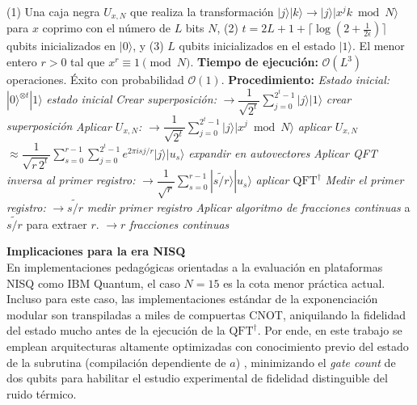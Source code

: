 \documentclass[12pt, spanish]{book}
\begin{document}
\begin{algorithm}[H]
    \caption{Búsqueda cuántica de orden \cite{Nielsen2024}}
    \label{alg:order_finding}
    \begin{algorithmic}[1]
        \Require (1) Una caja negra $U_{x,N}$ que realiza la transformación $|j\rangle|k\rangle \to |j\rangle|x^j k \bmod N\rangle$ para $x$ coprimo con el número de $L$ bits $N$, (2) $t = 2L + 1 + \lceil \log(2 + \frac{1}{2\epsilon}) \rceil$ qubits inicializados en $|0\rangle$, y (3) $L$ qubits inicializados en el estado $|1\rangle$.
        \Ensure El menor entero $r > 0$ tal que $x^r \equiv 1 \pmod{N}$.
        \Statex \textbf{Tiempo de ejecución:} $\mathcal{O}(L^3)$ operaciones. Éxito con probabilidad $\mathcal{O}(1)$.
        \Statex
        \Statex \textbf{Procedimiento:}
        \State \textit{Estado inicial:} $|0\rangle^{\otimes t}|1\rangle$ \hfill \textit{estado inicial}
        \State \textit{Crear superposición:}
        \Statex \hspace{2em} $\to \dfrac{1}{\sqrt{2^t}} \displaystyle\sum_{j=0}^{2^t-1} |j\rangle|1\rangle$ \hfill \textit{crear superposición}
        \State \textit{Aplicar $U_{x,N}$:}
        \Statex \hspace{2em} $\to \dfrac{1}{\sqrt{2^t}} \displaystyle\sum_{j=0}^{2^t-1} |j\rangle|x^j \bmod N\rangle$ \hfill \textit{aplicar $U_{x,N}$}
        \Statex \hspace{2em} $\approx \dfrac{1}{\sqrt{r\,2^t}} \displaystyle\sum_{s=0}^{r-1}\sum_{j=0}^{2^t-1} e^{2\pi i s j/r} |j\rangle|u_s\rangle$ \hfill \textit{expandir en autovectores}
        \State \textit{Aplicar QFT inversa al primer registro:}
        \Statex \hspace{2em} $\to \dfrac{1}{\sqrt{r}} \displaystyle\sum_{s=0}^{r-1} |\widetilde{s/r}\rangle|u_s\rangle$ \hfill \textit{aplicar $\mathrm{QFT}^{\dagger}$}
        \State \textit{Medir el primer registro:}
        \Statex \hspace{2em} $\to \widetilde{s/r}$ \hfill \textit{medir primer registro}
        \State \textit{Aplicar algoritmo de fracciones continuas} a $\widetilde{s/r}$ para extraer $r$.
        \Statex \hspace{2em} $\to r$ \hfill \textit{fracciones continuas}
    \end{algorithmic}
\end{algorithm}

\textbf{Implicaciones para la era NISQ}\\

En implementaciones pedagógicas orientadas a la evaluación en plataformas NISQ como IBM Quantum, el caso $N = 15$ es la cota menor práctica actual. Incluso para este caso, las implementaciones estándar de la exponenciación modular son transpiladas a miles de compuertas CNOT, aniquilando la fidelidad del estado mucho antes de la ejecución de la $\mathrm{QFT}^{\dagger}$. Por ende, en este trabajo se emplean arquitecturas altamente optimizadas con conocimiento previo del estado de la subrutina (compilación dependiente de $a$) \cite{villarreal}, minimizando el \textit{gate count} de dos qubits para habilitar el estudio experimental de fidelidad distinguible del ruido térmico.
\end{document}
